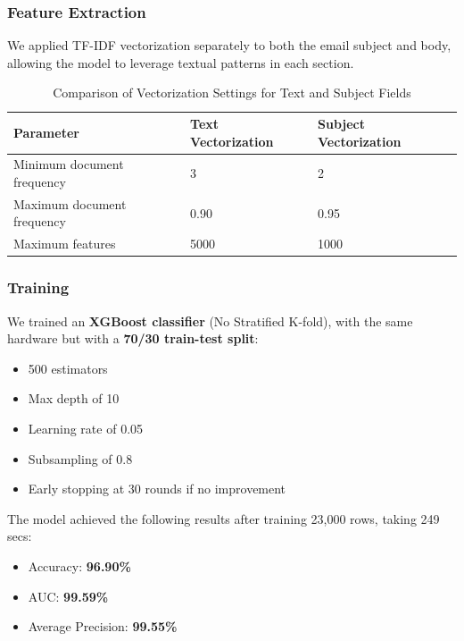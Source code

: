 \documentclass{article}
\begin{document}
\subsubsection*{Feature Extraction}
We applied TF-IDF vectorization separately to both the email subject and body, allowing the model to leverage textual patterns in each section.
\newline
\newline

\begin{table}[H]
\renewcommand{\arraystretch}{1.3}
\setlength{\tabcolsep}{12pt}
\centering
\begin{tabular}{|p{6cm}|p{5cm}|p{4cm}|}
\hline
\textbf{Parameter} & \textbf{Text Vectorization} & \textbf{Subject Vectorization} \\
\hline
Minimum document frequency & 3 & 2 \\
\hline
Maximum document frequency & 0.90 & 0.95 \\
\hline
Maximum features & 5000 & 1000 \\
\hline
\end{tabular}
\caption{Comparison of Vectorization Settings for Text and Subject Fields}
\label{tab:vectorization_settings}
\end{table}

\subsubsection*{Training}
We trained an \textbf{XGBoost classifier} (No Stratified K-fold), with the same hardware but with a \textbf{70/30 train-test split}:

\begin{itemize}
    \item 500 estimators
    \item Max depth of 10
    \item Learning rate of 0.05
    \item Subsampling of 0.8
    \item Early stopping at 30 rounds if no improvement
\end{itemize}

\noindent
The model achieved the following results after training 23,000 rows, taking 249 secs:

\begin{itemize}
    \item Accuracy: \textbf{96.90\%}
    \item AUC: \textbf{99.59\%}
    \item Average Precision: \textbf{99.55\%}
\end{itemize}
\end{document}
